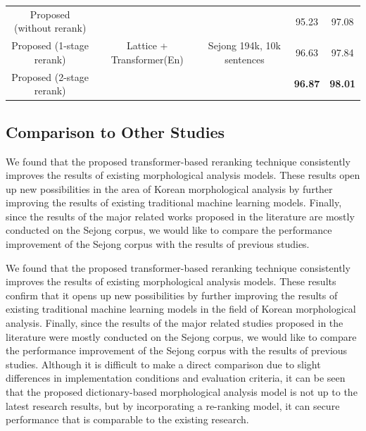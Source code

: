 \documentclass[AMS,STIX2COL]{WileyNJD-v2}
\begin{document}
\begin{table}[]
\begin{tabular*}{500pt}{@{\extracolsep\fill}ccc|cc@{\extracolsep\fill}}
            \midrule
            Proposed (without rerank)             & \multirow{3}{*}{Lattice + Transformer(En)} & \multirow{3}{*}{Sejong 194k, 10k sentences} & 95.23                      & 97.08                        \\
            Proposed (1-stage rerank)             & ~                                          & ~                                           & 96.63                      & 97.84                        \\
            Proposed (2-stage rerank)             & ~                                          & ~                                           & \textbf{96.87}             & \textbf{98.01}               \\
            \bottomrule
        \end{tabular*}
    \end{table}

    \subsection{Comparison to Other Studies}\label{subsec5.5}

    We found that the proposed transformer-based reranking technique consistently improves the results of existing morphological analysis models. These results open up new possibilities in the area of Korean morphological analysis by further improving the results of existing traditional machine learning models.
    Finally, since the results of the major related works proposed in the literature are mostly conducted on the Sejong corpus, we would like to compare the performance improvement of the Sejong corpus with the results of previous studies.

    We found that the proposed transformer-based reranking technique consistently improves the results of existing morphological analysis models. These results confirm that it opens up new possibilities by further improving the results of existing traditional machine learning models in the field of Korean morphological analysis. Finally, since the results of the major related studies proposed in the literature were mostly conducted on the Sejong corpus, we would like to compare the performance improvement of the Sejong corpus with the results of previous studies. Although it is difficult to make a direct comparison due to slight differences in implementation conditions and evaluation criteria, it can be seen that the proposed dictionary-based morphological analysis model is not up to the latest research results, but by incorporating a re-ranking model, it can secure performance that is comparable to the existing research.
\end{document}
